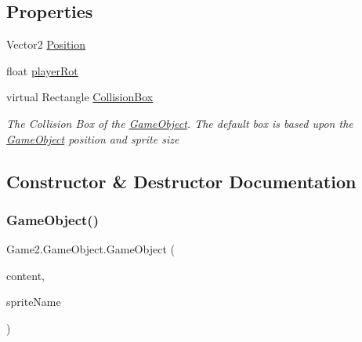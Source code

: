 \subsection*{Properties}
\begin{DoxyCompactItemize}
\item 
Vector2 \mbox{\hyperlink{class_game2_1_1_game_object_af5b0b48192336247e09d52a7fc6f56ad}{Position}}
\item 
float \mbox{\hyperlink{class_game2_1_1_game_object_a7983716d3a4ed64a1a2200642a301079}{player\+Rot}}
\item 
virtual Rectangle \mbox{\hyperlink{class_game2_1_1_game_object_ab6a6d45b66a978f710da6a3ec0588083}{Collision\+Box}}
\begin{DoxyCompactList}\small\item\em The Collision Box of the \mbox{\hyperlink{class_game2_1_1_game_object}{Game\+Object}}. The default box is based upon the \mbox{\hyperlink{class_game2_1_1_game_object}{Game\+Object}} position and sprite size \end{DoxyCompactList}\end{DoxyCompactItemize}


\subsection{Constructor \& Destructor Documentation}
\mbox{\label{class_game2_1_1_game_object_ad2a99e120df1d04d1a737bbf9b8fb2a0}} 
\subsubsection{\texorpdfstring{Game\+Object()}{GameObject()}\hspace{0.1cm}{\footnotesize\ttfamily [1/2]}}
{\footnotesize\ttfamily Game2.\+Game\+Object.\+Game\+Object (\begin{DoxyParamCaption}\item[{Content\+Manager}]{content,  }\item[{string}]{sprite\+Name }\end{DoxyParamCaption})}



